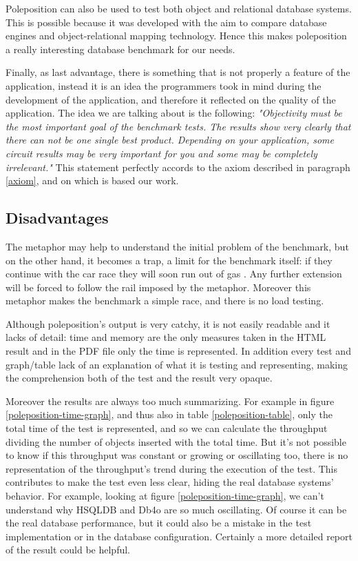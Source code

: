 Poleposition can also be used to test both object and relational database systems. This is possible because it was developed with the aim to compare database engines and object-relational mapping technology. Hence this makes poleposition a really interesting database benchmark for our needs.

Finally, as last advantage, there is something that is not properly a feature of the application, instead it is an idea the programmers took in mind during the development of the application, and therefore it reflected on the quality of the application. The idea we are talking about is the following:
\emph{"Objectivity must be the most important goal of the benchmark tests. The results show very clearly that there can not be one single best product. Depending on your application, some circuit results may be very important for you and some may be completely irrelevant."} 
This statement perfectly accords to the axiom described in paragraph \ref{axiom}, and on which is based our work.

		\subsection{Disadvantages}
The metaphor may help to understand the initial problem of the benchmark, but on the other hand, it becomes a trap, a limit for the benchmark itself: if they continue with the car race they will soon run out of gas \cite{poleposition}. Any further extension will be forced to follow the rail imposed by the metaphor. Moreover this metaphor makes the benchmark a simple race, and there is no load testing.

Although poleposition's output is very catchy, it is not easily readable and it lacks of detail: time and memory are the only measures taken in the HTML result and in the PDF file only the time is represented. In addition every test and graph/table lack of an explanation of what it is testing and representing, making the comprehension both of the test and the result very opaque. 

Moreover the results are always too much summarizing. For example in figure \ref{poleposition-time-graph}, and thus also in table \ref{poleposition-table}, only the total time of the test is represented, and so we can calculate the throughput dividing the number of objects inserted with the total time. But it's not possible to know if this throughput was constant or growing or oscillating too, there is no representation of the throughput's trend during the execution of the test. This contributes to make the test even less clear, hiding the real database systems' behavior. For example, looking at figure \ref{poleposition-time-graph}, we can't understand why HSQLDB and Db4o are so much oscillating. Of course it can be the real database performance, but it could also be a mistake in the test implementation or in the database configuration. Certainly a more detailed report of the result could be helpful.

